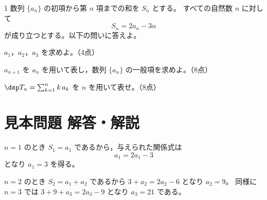 \begin{monsheet}

\noindent{}

\begin{daimon}{1}
数列 $\{a_{n}\}$ の初項から第 $n$ 項までの和を $S_{n}$ とする。
すべての自然数 $n$ に対して
\[
  S_{n}=2a_{n}-3n
\]
が成り立つとする。以下の問いに答えよ。
\begin{shomon}
  \item $a_{1}$，$a_{2}$，$a_{3}$ を求めよ。\hfill（4点）
  \item $a_{n+1}$ を $a_{n}$ を用いて表し，数列 $\{a_{n}\}$ の一般項を求めよ。\hfill（8点）
  \item $\dsp T_{n}=\sum_{k=1}^{n}k\,a_{k}$ を $n$ を用いて表せ。\hfill（8点）
\end{shomon}
\end{daimon}

\end{monsheet}

\section*{見本問題 解答・解説}


$n=1$ のとき $S_{1}=a_{1}$ であるから，与えられた関係式は
\[
  a_{1}=2a_{1}-3
\]
となり $a_{1}=3$ を得る。

\smallskip
$n=2$ のとき $S_{2}=a_{1}+a_{2}$ であるから $3+a_{2}=2a_{2}-6$ となり $a_{2}=9$。
同様に $n=3$ では $3+9+a_{3}=2a_{3}-9$ となり $a_{3}=21$ である。


